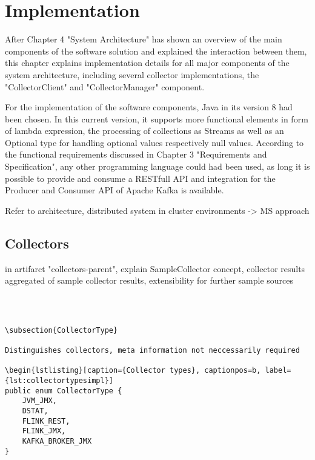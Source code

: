 \chapter{Implementation}

After Chapter 4 "System Architecture" has shown an overview of the main components of the software solution and
explained the interaction between them, this chapter explains implementation details for all major components of
the system architecture, including several collector implementations, the "CollectorClient" and "CollectorManager"
component.

For the implementation of the software components, Java in its version 8 had been chosen. In this current version,
it supports more functional elements in form of lambda expression, the processing of collections as Streams as well
as an Optional type for handling optional values respectively null values. According to the functional requirements
discussed in Chapter 3 "Requirements and Specification", any other programming language could had been used, as long
it is possible to provide and consume a RESTfull API and integration for the Producer and Consumer API of Apache
Kafka is available.

Refer to architecture, distributed system in cluster environments -> MS approach

\section{Collectors}

in artifarct "collectors-parent", explain SampleCollector concept, collector results aggregated of sample collector results,
extensibility for further sample sources

\begin{lstlisting}[caption={ types}, captionpos=b, label={lst:jvmsampleregistry}]



\subsection{CollectorType}

Distinguishes collectors, meta information not neccessarily required

\begin{lstlisting}[caption={Collector types}, captionpos=b, label={lst:collectortypesimpl}]
public enum CollectorType {
    JVM_JMX,
    DSTAT,
    FLINK_REST,
    FLINK_JMX,
    KAFKA_BROKER_JMX
}
\end{lstlisting}

